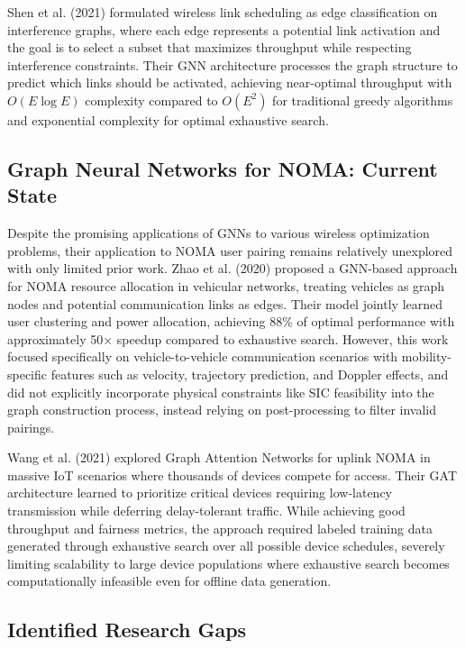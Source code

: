 Shen et al. (2021) formulated wireless link scheduling as edge classification on interference graphs, where each edge represents a potential link activation and the goal is to select a subset that maximizes throughput while respecting interference constraints. Their GNN architecture processes the graph structure to predict which links should be activated, achieving near-optimal throughput with $O(E \log E)$ complexity compared to $O(E^2)$ for traditional greedy algorithms and exponential complexity for optimal exhaustive search.

\subsection{Graph Neural Networks for NOMA: Current State}

Despite the promising applications of GNNs to various wireless optimization problems, their application to NOMA user pairing remains relatively unexplored with only limited prior work. Zhao et al. (2020) proposed a GNN-based approach for NOMA resource allocation in vehicular networks, treating vehicles as graph nodes and potential communication links as edges. Their model jointly learned user clustering and power allocation, achieving 88\% of optimal performance with approximately 50× speedup compared to exhaustive search. However, this work focused specifically on vehicle-to-vehicle communication scenarios with mobility-specific features such as velocity, trajectory prediction, and Doppler effects, and did not explicitly incorporate physical constraints like SIC feasibility into the graph construction process, instead relying on post-processing to filter invalid pairings.

Wang et al. (2021) explored Graph Attention Networks for uplink NOMA in massive IoT scenarios where thousands of devices compete for access. Their GAT architecture learned to prioritize critical devices requiring low-latency transmission while deferring delay-tolerant traffic. While achieving good throughput and fairness metrics, the approach required labeled training data generated through exhaustive search over all possible device schedules, severely limiting scalability to large device populations where exhaustive search becomes computationally infeasible even for offline data generation.

\subsection{Identified Research Gaps}


